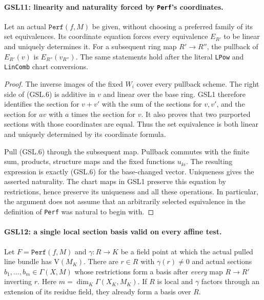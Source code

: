 \paragraph{GSL11: linearity and naturality forced by \texttt{Perf}'s coordinates.}
\label{claim:GSL11}
Let an actual $\texttt{Perf}(f,M)$ be given, without choosing a
preferred family of its set equivalences.  Its coordinate equation
forces every equivalence $E_{R'}$ to be linear and uniquely determines
it.  For a subsequent ring map $R'\to R''$, the pullback of
$E_{R'}(v)$ is $E_{R''}(v_{R''})$.  The same statements hold after
the literal \texttt{LPow} and \texttt{LinComb} chart conversions.

\begin{proof}
The inverse images of the fixed $W_i$ cover every pullback scheme.
The right side of (GSL.6) is additive in $v$ and linear over the
base ring.  GSL1 therefore identifies the section for $v+v'$ with
the sum of the sections for $v,v'$, and the section for $av$ with
$a$ times the section for $v$.  It also proves that two purported
sections with those coordinates are equal.  Thus the set equivalence
is both linear and uniquely determined by its coordinate formula.

Pull (GSL.6) through the subsequent map.  Pullback commutes with the
finite sum, products, structure maps and the fixed functions $u_{ki}$.
The resulting expression is exactly (GSL.6) for the base-changed
vector.  Uniqueness gives the asserted naturality.  The chart maps
in GSL1 preserve this equation by restrictions, hence preserve its
uniqueness and all these operations.  In particular, the argument
does not assume that an arbitrarily selected equivalence in the
definition of \texttt{Perf} was natural to begin with.
\end{proof}

\paragraph{GSL12: a single local section basis valid on every affine test.}
\label{claim:GSL12}
Let $F=\texttt{Perf}(f,M)$ and $\gamma:R\to K$ be a field point
at which the actual pulled line bundle has $\mathrm V(M_K)$.
There are $r\in R$ with $\gamma(r)\ne0$ and actual sections
$b_1,\ldots,b_m\in\Gamma(X,M)$ whose restrictions form a basis
after \emph{every} map $R\to R'$ inverting $r$.  Here
$m=\dim_K\Gamma(X_K,M_K)$.  If $R$ is local and $\gamma$ factors
through an extension of its residue field, they already form a basis
over $R$.


